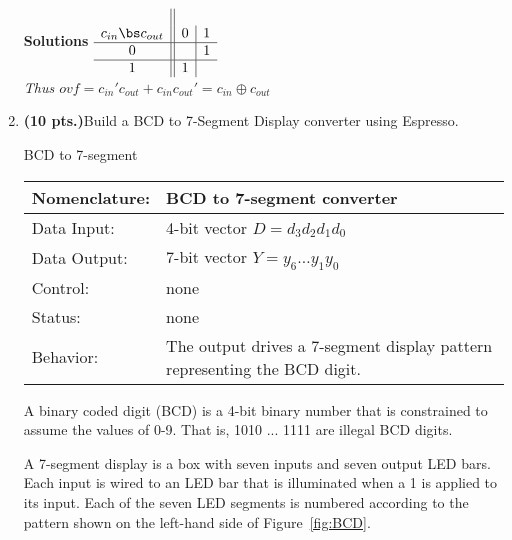 \begin{enumerate}
            \begin{onlysolution} \textbf{Solutions} \itshape{
                    $
                    \begin{array} {c||c|c} \\
                        c_{in}  \bs c_{out} & 0 & 1 \\ \hline
                        0    &   & 1 \\ \hline
                        1    & 1 &   \\
                    \end{array}$   \\
                    Thus $ovf = c_{in}' c_{out} + c_{in} c_{out}' =  c_{in} \oplus c_{out} $
                }
            \end{onlysolution}

        \item \textbf{ (10 pts.)}Build a BCD to 7-Segment Display converter using
            Espresso.

            \begin{buildingblock}{BCD to 7-segment}
                \label{page:7seg}
                \begin{tabular}{|l|p{3.5in}|} \hline
                    Nomenclature:  & BCD to 7-segment converter                \\ \hline
                    Data Input:    & 4-bit vector $D=d_3 d_2 d_1 d_0$  \\ \hline
                    Data Output:   & 7-bit vector $Y=y_6 \ldots y_1 y_0$    \\ \hline
                    Control:       & none                                   \\ \hline
                    Status:        & none                                   \\ \hline
                    Behavior:      & The output drives a 7-segment display pattern
                    representing the BCD digit.  \\ \hline
                \end{tabular}
            \end{buildingblock}

            A binary coded digit (BCD) is a 4-bit binary number that is constrained
            to assume the values of 0-9. That is, 1010 ... 1111 are illegal BCD digits.

            A 7-segment display is a box with seven inputs and seven output LED bars.
            Each input is wired to an LED bar that is illuminated when a 1 is applied
            to its input.
            Each of the seven LED segments is numbered according to the pattern shown
            on the left-hand side of Figure~\ref{fig:BCD}.


\end{enumerate}
